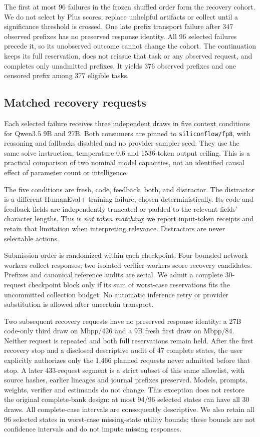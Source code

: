 \documentclass[10pt,twocolumn]{article}
\begin{document}
The first at most 96 failures in the frozen shuffled order form the recovery
cohort. We do not select by Plus scores, replace unhelpful artifacts or collect
until a significance threshold is crossed. One late prefix transport failure
after 347 observed prefixes has no preserved response identity. All 96 selected
failures precede it, so its unobserved outcome cannot change the cohort.
The continuation keeps its full reservation, does not reissue that task or any
observed request, and completes only unadmitted prefixes. It yields 376 observed
prefixes and one censored prefix among 377 eligible tasks.

\subsection{Matched recovery requests}

Each selected failure receives three independent draws in five context
conditions for Qwen3.5 9B and 27B. Both consumers are pinned to
\texttt{siliconflow/fp8}, with reasoning and fallbacks disabled and no provider
sampler seed. They use the same solve instruction, temperature 0.6 and 1536-token
output ceiling. This is a practical comparison of two nominal model capacities,
not an identified causal effect of parameter count or intelligence.

The five conditions are fresh, code, feedback, both, and distractor. The
distractor is a different HumanEval+ training failure, chosen deterministically.
Its code and feedback fields are independently truncated or padded to the
relevant fields' character lengths. This is \emph{not token matching}; we report
input-token receipts and retain that limitation when interpreting relevance.
Distractors are never selectable actions.

Submission order is randomized within each checkpoint. Four bounded network
workers collect responses; two isolated verifier workers score recovery
candidates. Prefixes and canonical reference audits are serial. We admit a
complete 30-request checkpoint block only if its sum of worst-case reservations
fits the uncommitted collection budget. No automatic inference retry or provider
substitution is allowed after uncertain transport.

Two subsequent recovery requests have no preserved response identity: a 27B
code-only third draw on Mbpp/426 and a 9B fresh first draw on Mbpp/84. Neither
request is repeated and both full reservations remain held. After the first
recovery stop and a disclosed descriptive audit of 47 complete states, the user
explicitly authorizes only the 1,466 planned requests never admitted before that
stop. A later 433-request segment is a strict subset of this same allowlist,
with source hashes, earlier lineages and journal prefixes preserved. Models,
prompts, weights, verifier and estimands do not change. This exception does not
restore the original complete-bank design: at most 94/96 selected states can
have all 30 draws. All complete-case intervals are consequently descriptive.
We also retain all 96 selected states in worst-case missing-state utility bounds;
these bounds are not confidence intervals and do not impute missing responses.
\end{document}
